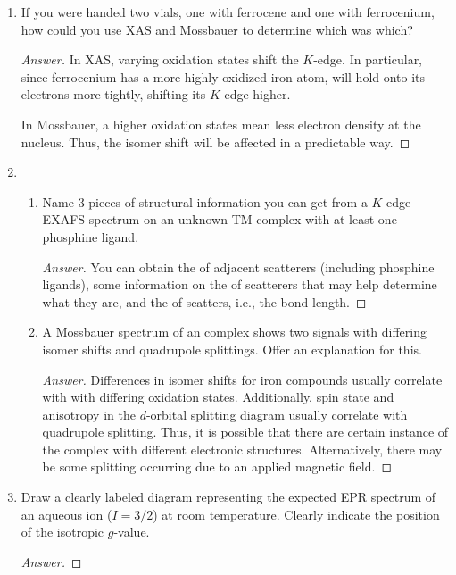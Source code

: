 \documentclass[../psets.tex]{subfiles}
\begin{document}
\begin{enumerate}
\begin{enumerate}
\begin{proof}[Answer]
\begin{equation*}
            \end{equation*}
        \end{proof}
    \end{enumerate}
    \item If you were handed two vials, one with ferrocene and one with ferrocenium, how could you use XAS and Mossbauer to determine which was which?
    \begin{proof}[Answer]
        In XAS, varying oxidation states shift the $K$-edge. In particular, since ferrocenium has a more highly oxidized iron atom,  will hold onto its electrons more tightly, shifting its $K$-edge higher.\par
        In Mossbauer, a higher oxidation states mean less electron density at the nucleus. Thus, the isomer shift will be affected in a predictable way.
    \end{proof}
    \item 
    \begin{enumerate}
        \item Name 3 pieces of structural information you can get from a $K$-edge EXAFS spectrum on an unknown TM complex with at least one phosphine ligand.
        \begin{proof}[Answer]

            You can obtain the  of adjacent scatterers (including phosphine ligands), some information on the  of scatterers that may help determine what they are, and the  of scatters, i.e., the bond length.
        \end{proof}
        \item A Mossbauer spectrum of an  complex shows two signals with differing isomer shifts and quadrupole splittings. Offer an explanation for this.
        \begin{proof}[Answer]

            Differences in isomer shifts for iron compounds usually correlate with with differing oxidation states. Additionally, spin state and anisotropy in the $d$-orbital splitting diagram usually correlate with quadrupole splitting. Thus, it is possible that there are certain instance of the complex with different electronic structures. Alternatively, there may be some splitting occurring due to an applied magnetic field.
        \end{proof}
    \end{enumerate}
    \item Draw a clearly labeled diagram representing the expected EPR spectrum of an aqueous  ion ($I=3/2$) at room temperature. Clearly indicate the position of the isotropic $g$-value.
    \begin{proof}[Answer]


\end{proof}
\end{enumerate}
\end{document}

